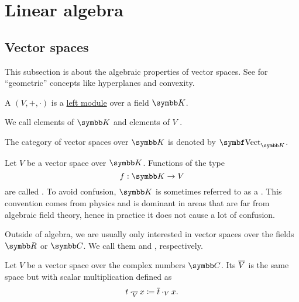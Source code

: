 \section{Linear algebra}\label{sec:linear_algebra}
\subsection{Vector spaces}\label{subsec:vector_spaces}

This subsection is about the algebraic properties of vector spaces. See  for \enquote{geometric} concepts like hyperplanes and convexity.

\begin{definition}\label{def:vector_space}
  A  \( (V, +, \cdot) \) is a \hyperref[def:left_module]{left module} over a field \( \BK \).

  We call elements of \( \BK \)  and elements of \( V \) .

  The category of vector spaces over \( \BK \) is denoted by \( \Cat{Vect}_{\BK} \).
\end{definition}

\begin{definition}\label{def:vector_field}
  Let \( V \) be a vector space over \( \BK \). Functions of the type
  \begin{equation*}
    f: \BK \to V
  \end{equation*}
  are called . To avoid confusion, \( \BK \) is sometimes referred to as a . This convention comes from physics and is dominant in areas that are far from algebraic field theory, hence in practice it does not cause a lot of confusion.
\end{definition}

\begin{remark}\label{remark:real_vector_space}
  Outside of algebra, we are usually only interested in vector spaces over the fields \( \BR \) or \( \BC \). We call them  and , respectively.
\end{remark}

\begin{definition}\label{def:complex_conjucate_vector_space}
  Let \( V \) be a vector space over the complex numbers \( \BC \). Its  \( \overline{V} \) is the same space but with scalar multiplication defined as
  \begin{equation*}
    t \cdot_{\overline{V}} x \coloneqq \overline{t} \cdot_V x.
  \end{equation*}
\end{definition}

